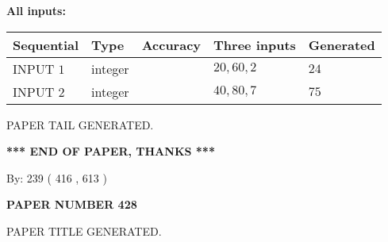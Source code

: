 \documentclass[12pt]{article}
\begin{document}
   
   
   
\noindent\vspace{0.1in}\hspace{-0.08in} {\textbf{\Large{All inputs: }}}
   
   
  
  
\noindent\begin{tabular}{|l|l|l|l|l|}
\hline
 Sequential & Type & Accuracy & Three inputs & Generated \\ 
\hline
 
 
  INPUT $  1 $ & integer &  & $
 20
 , 
 60
 , 
 2
 $ & $ 24 $ 
 \\  \hline  
 
 
  INPUT $  2 $ & integer &  & $
 40
 , 
 80
 , 
 7
 $ & $ 75 $ 
 \\  \hline  
 \end{tabular}
   
   
   
   
   
   
 \vspace{0.2in}
 
   
   
\vspace{2.0in} PAPER TAIL GENERATED.
   
   
   
   
\vspace{1.0in} 
{\textbf{\large{ *** END OF PAPER, THANKS *** }}} 
   
   
\hspace{1.0in} By: 
 239 ( 416 ,  613 )
   
   
   
   
\newpage 
\setcounter{page}{ 
   428001 } 
   
   
   
   
 {\textbf{ \Large{ PAPER NUMBER  428  }}}
   
   
\vspace{0.2in}
   
   
   
   
   
   
   
   
 \vspace{0.2in}
 
 
 
 
   
   
 PAPER TITLE GENERATED.
   
   
   
\vspace{0.2in}
   
\end{document}

